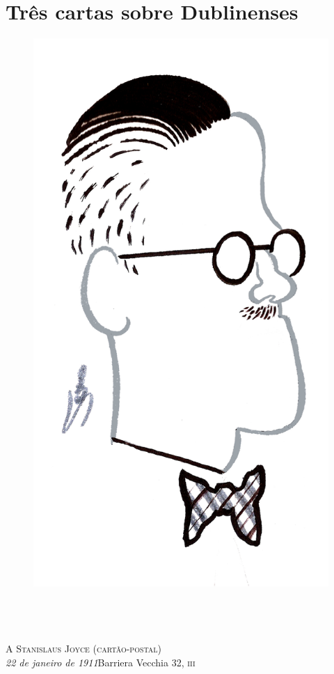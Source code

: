 

\makeatletter
\renewcommand\@endpart{\vfil\clearpage}
\makeatother

\part{Três cartas sobre Dublinenses}

\begin{figure}[c]
\begin{center}
\includegraphics[width=.6\textwidth]{joyce1.jpg}
\end{center}
\end{figure}

\chapter*{\ }

\pagestyle{plain}


{\raggedright\large
\textsc{A Stanislaus Joyce (cartão-postal)}\\\smallskip\normalsize
\textit{22 de janeiro de 1911}\hfill Barriera Vecchia 32, \textsc{iii}
\par}


